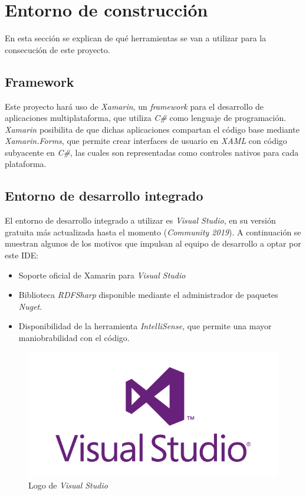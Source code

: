 
\section{Entorno de construcción}
En esta sección se explican de qué herramientas se van a utilizar para la consecución de este proyecto.

\subsection{Framework}
Este proyecto hará uso de \textit{Xamarin}, un \textit{framework} para el desarrollo de aplicaciones multiplataforma, que 
utiliza \textit{C\#} como lenguaje de programación. \textit{Xamarin} posibilita de que dichas aplicaciones 
compartan el código base mediante \textit{Xamarin.Forms}, que permite crear interfaces de usuario en \textit{XAML} con 
código subyacente en \textit{C\#}, las cuales son representadas como controles nativos para cada plataforma.

\subsection{Entorno de desarrollo integrado}
El entorno de desarrollo integrado a utilizar es \textit{Visual Studio}, en su versión gratuita más actualizada hasta el momento
(\textit{Community 2019}). A continuación se muestran algunos de los motivos que impulsan al equipo de desarrollo a optar por este IDE:

\begin{itemize}
    \item Soporte oficial de Xamarin para \textit{Visual Studio}
    \item Biblioteca \textit{RDFSharp} disponible mediante el administrador de paquetes \textit{Nuget}.
    \item Disponibilidad de la herramienta \textit{IntelliSense}, que permite una mayor maniobrabilidad con el código.
\end{itemize}

\begin{figure}
    \centering
    \includegraphics[scale=0.2]{Figures/Logo_VisualStudio.png}
    \caption{Logo de \textit{Visual Studio}}
    \label{Logo_VS}
\end{figure}

